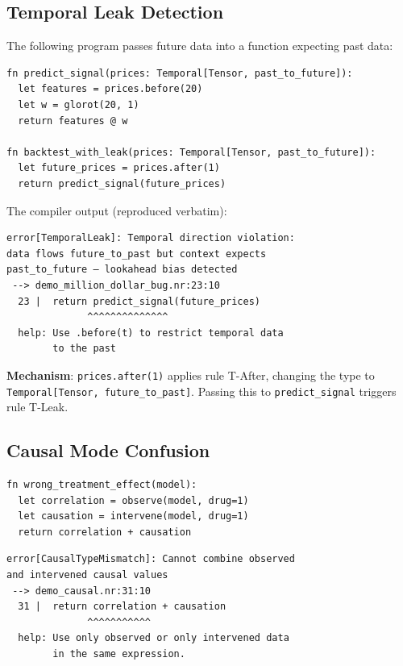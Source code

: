 \documentclass[11pt,a4paper]{article}
\newcommand{\ty}[1]{\texttt{#1}}
\begin{document}
\subsection{Temporal Leak Detection}

The following program passes future data into a function expecting past data:

\begin{lstlisting}
fn predict_signal(prices: Temporal[Tensor, past_to_future]):
  let features = prices.before(20)
  let w = glorot(20, 1)
  return features @ w

fn backtest_with_leak(prices: Temporal[Tensor, past_to_future]):
  let future_prices = prices.after(1)
  return predict_signal(future_prices)
\end{lstlisting}

The compiler output (reproduced verbatim):

\begin{Verbatim}[fontsize=\small,frame=single]
error[TemporalLeak]: Temporal direction violation:
data flows future_to_past but context expects
past_to_future — lookahead bias detected
 --> demo_million_dollar_bug.nr:23:10
  23 |  return predict_signal(future_prices)
              ^^^^^^^^^^^^^^
  help: Use .before(t) to restrict temporal data
        to the past
\end{Verbatim}

\textbf{Mechanism}: \ty{prices.after(1)} applies rule T-After, changing the type to \ty{Temporal[Tensor, future\_to\_past]}. Passing this to \ty{predict\_signal} triggers rule T-Leak.

\subsection{Causal Mode Confusion}

\begin{lstlisting}
fn wrong_treatment_effect(model):
  let correlation = observe(model, drug=1)
  let causation = intervene(model, drug=1)
  return correlation + causation
\end{lstlisting}

\begin{Verbatim}[fontsize=\small,frame=single]
error[CausalTypeMismatch]: Cannot combine observed
and intervened causal values
 --> demo_causal.nr:31:10
  31 |  return correlation + causation
              ^^^^^^^^^^^
  help: Use only observed or only intervened data
        in the same expression.
\end{Verbatim}
\end{document}
